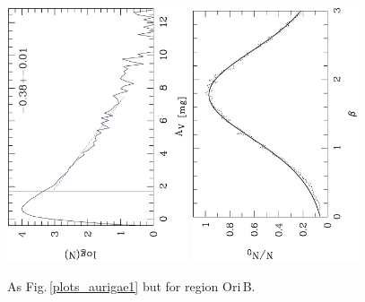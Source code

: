 \documentclass[useAMS,usenatbib]{mn2e}
\begin{document}
\begin{appendix}
\begin{figure}
\includegraphics[height=7.5cm,angle=-90]{av_dist_oria.ps}
\hfill
\includegraphics[height=7.5cm,angle=-90]{histo_oria.ps}
\caption{\label{plots_oria} As Fig.\,\ref{plots_aurigae1} but for region
Ori\,B.}  

\end{figure}


\end{appendix}
\end{document}
